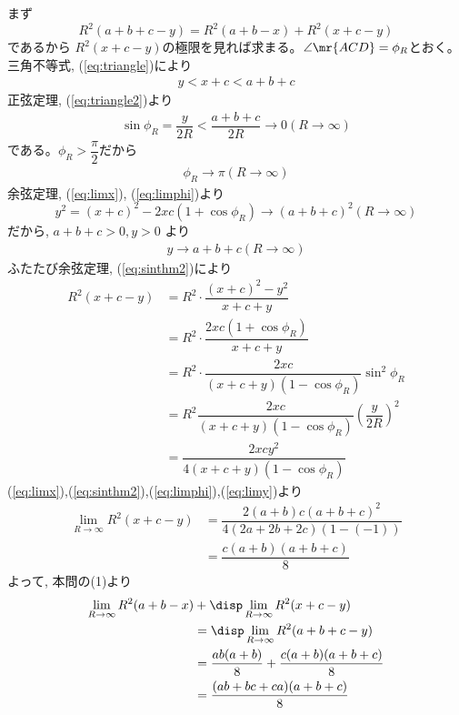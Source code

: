 まず
\[R^2(a+b+c-y)=R^2(a+b-x)+R^2(x+c-y)\]
であるから $R^2(x+c-y)$の極限を見れば求まる。$\angle{\mr{ACD}}=\phi_R$とおく。三角不等式, (\ref{eq:triangle})により
\begin{eqnarray}
y<x+c<a+b+c\label{eq:triangle2}
\end{eqnarray}
正弦定理, (\ref{eq:triangle2})より
\begin{eqnarray}
\sin{\phi_R}=\dfrac{y}{2R}<\dfrac{a+b+c}{2R}\to 0　(R\to \infty)\label{eq:sinthm2}
\end{eqnarray}
である。$\phi_R>\dfrac{\pi}{2}$だから
\begin{eqnarray}
\phi_R\to\pi　(R\to\infty)\label{eq:limphi}
\end{eqnarray}
余弦定理,  (\ref{eq:limx}), (\ref{eq:limphi})より
\[y^2=(x+c)^2-2xc(1+\cos{\phi_R})\to (a+b+c)^2　(R\to\infty)\]
だから, $a+b+c>0, y>0$ より 
\begin{eqnarray}
y\to a+b+c　(R\to\infty)\label{eq:limy}
\end{eqnarray}
ふたたび余弦定理, (\ref{eq:sinthm2})により
\begin{align*}
 R^2(x+c-y)&=R^2\cdot\dfrac{(x+c)^2-y^2}{x+c+y}\\
 &=R^2\cdot\dfrac{2xc(1+\cos{\phi_R})}{x+c+y}\\
 &=R^2\cdot\dfrac{2xc}{(x+c+y)(1-\cos{\phi_R})}\sin^2{\phi_R}\\
 &=R^2\dfrac{2xc}{(x+c+y)(1-\cos{\phi_R})}\left(\dfrac{y}{2R}\right)^2\\
 &=\dfrac{2xcy^2}{4(x+c+y)(1-\cos{\phi_R})}
\end{align*}
(\ref{eq:limx}),(\ref{eq:sinthm2}),(\ref{eq:limphi}),(\ref{eq:limy})より
\begin{align*}
 \lim_{R\to\infty}R^2(x+c-y)&=\dfrac{2(a+b)c(a+b+c)^2}{4(2a+2b+2c)(1-(-1))}\\
 &=\dfrac{c(a+b)(a+b+c)}{8}
\end{align*}
よって, 本問の(1)より
\begin{align*}
 \lim_{R\to\infty}R^2(a+b-x)&+\disp\lim_{R\to\infty}R^2(x+c-y)\\
 &=\disp\lim_{R\to\infty}R^2(a+b+c-y)\\
 &=\dfrac{ab(a+b)}{8}+\dfrac{c(a+b)(a+b+c)}{8}\\
 &=\dfrac{(ab+bc+ca)(a+b+c)}{8}
\end{align*}

